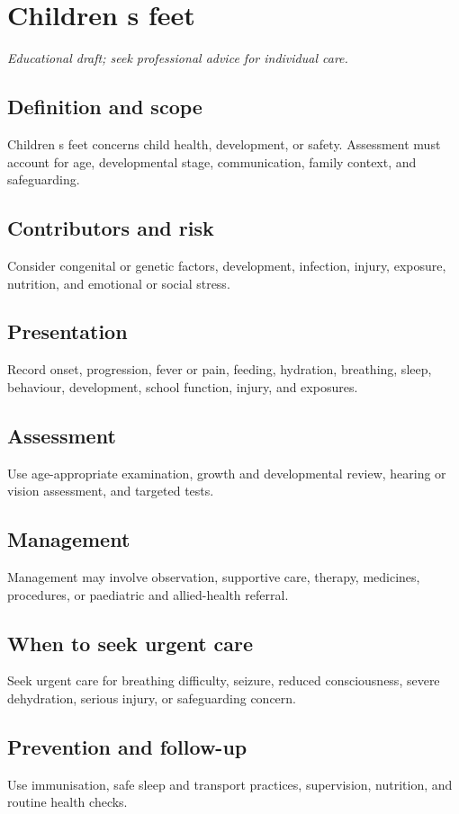 \chapter{Children s feet}

\medskip
\noindent\textit{Educational draft; seek professional advice for individual care.}

\section*{Definition and scope}
Children s feet concerns child health, development, or safety. Assessment must account for age, developmental stage, communication, family context, and safeguarding.

\section*{Contributors and risk}
Consider congenital or genetic factors, development, infection, injury, exposure, nutrition, and emotional or social stress.

\section*{Presentation}
Record onset, progression, fever or pain, feeding, hydration, breathing, sleep, behaviour, development, school function, injury, and exposures.

\section*{Assessment}
Use age-appropriate examination, growth and developmental review, hearing or vision assessment, and targeted tests.

\section*{Management}
Management may involve observation, supportive care, therapy, medicines, procedures, or paediatric and allied-health referral.

\section*{When to seek urgent care}
Seek urgent care for breathing difficulty, seizure, reduced consciousness, severe dehydration, serious injury, or safeguarding concern.

\section*{Prevention and follow-up}
Use immunisation, safe sleep and transport practices, supervision, nutrition, and routine health checks.

